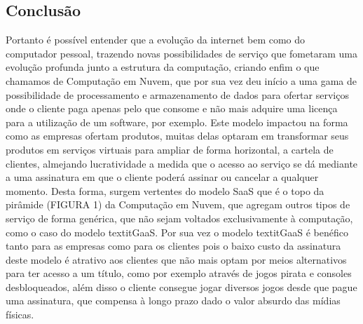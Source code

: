 \begin{justify}
    \section{Conclusão}                                                                                 
    Portanto é possível entender que a evolução da internet bem como do computador pessoal, trazendo    
    novas possibilidades de serviço que fometaram uma evolução profunda junto a estrutura               
    da computação, criando enfim o que chamamos de Computação em Nuvem, que por sua vez deu início a    
    uma gama de possibilidade de processamento e armazenamento de dados para ofertar serviços onde o    
    cliente paga apenas pelo que consome e não mais adquire uma licença para a utilização de um         
    software, por exemplo.                                                                              
    Este modelo impactou na forma como as empresas ofertam produtos, muitas delas optaram em            
    transformar seus produtos em serviços virtuais para ampliar de forma horizontal, a cartela de       
    clientes, almejando lucratividade a medida que o acesso ao serviço se dá mediante a uma             
    assinatura em que o cliente poderá assinar ou cancelar a qualquer momento.                          
    Desta forma, surgem vertentes do modelo SaaS que é o topo da pirâmide (FIGURA 1) da Computação      
    em Nuvem, que agregam outros tipos de serviço de forma genérica, que não sejam voltados             
    exclusivamente à computação, como o caso do modelo textit{GaaS}.                                    
    Por sua vez o modelo textit{GaaS} é benéfico tanto para as empresas como para os clientes pois o    
    baixo custo da assinatura deste modelo é atrativo aos clientes que não mais optam por meios         
    alternativos para ter acesso a um título, como por exemplo através de jogos pirata e consoles       
    desbloqueados, além disso o cliente consegue jogar diversos jogos desde que pague uma               
    assinatura, que compensa à longo prazo dado o valor absurdo das mídias físicas.                     
                                                                                                        
                                                                                               
\end{justify}